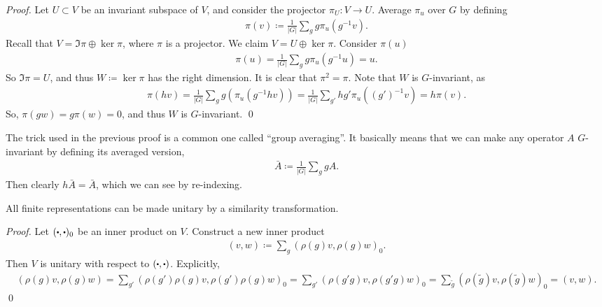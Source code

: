 \documentclass[11pt]{article}
\begin{document}
\begin{proof}
    Let $U \subset V$ be an invariant subspace of $V$, and
    consider the projector $\pi_U \colon V \to U$.
    Average $\pi_u$ over $G$ by defining
    \begin{align*}
        \pi(v) \coloneqq \frac{1}{|G|} \sum_g g \pi_u(g^{-1} v).
    \end{align*}
    Recall that $V = \Im{\pi} \oplus \ker{\pi}$, where $\pi$ is a
    projector. We claim $V = U \oplus \ker{\pi}$. Consider $\pi(u)$
    \begin{align*}
        \pi(u) = \frac{1}{|G|} \sum_g g \pi_u(g^{-1}u) = u.
    \end{align*}
    So $\Im{\pi} = U$, and thus $W \coloneqq \ker{\pi}$ has
    the right dimension. It is clear that $\pi^2 = \pi$. Note 
    that $W$ is $G$-invariant, as
    \begin{align*}
        \pi(hv) = \frac{1}{|G|} \sum_g g(\pi_u(g^{-1}hv)) = \frac{1}{|G|} \sum_{g'} hg' \pi_u((g')^{-1}v) = h \pi(v).
    \end{align*}
    So, $\pi(gw) = g\pi(w) = 0$, and thus $W$ is $G$-invariant.
    \qed
\end{proof}

\begin{nnote}
    The trick used in the previous proof is a common one called
    ``group averaging''. It basically means that we can make any
    operator $A$ $G$-invariant by defining its averaged version,
    \begin{align*}
        \bar{A} \coloneqq \frac{1}{|G|} \sum_g g A.
    \end{align*}
    Then clearly $h\bar{A} = \bar{A}$, which we can see by re-indexing.
\end{nnote}

\begin{theorem}
    All finite representations can be made unitary by a similarity transformation.
\end{theorem}

\begin{proof}
    Let $(\sbullet, \sbullet)_0$ be an inner product on $V$. Construct a new inner product
    \begin{align*}
        (v, w) \coloneqq \sum_g (\rho(g)v, \rho(g)w)_0.
    \end{align*}
    Then $V$ is unitary with respect to $(\sbullet, \sbullet)$. Explicitly,
    \begin{align*}
        (\rho(g)v, \rho(g)w) = \sum_{g'} (\rho(g')\rho(g)v, \rho(g')\rho(g)w)_0
        = \sum_{g'} (\rho(g'g)v, \rho(g'g)w)_0 = \sum_{\tilde{g}} (\rho(\tilde{g})v, \rho(\tilde{g})w)_0 = (v, w).
    \end{align*}
    \qed
\end{proof}
\end{document}
